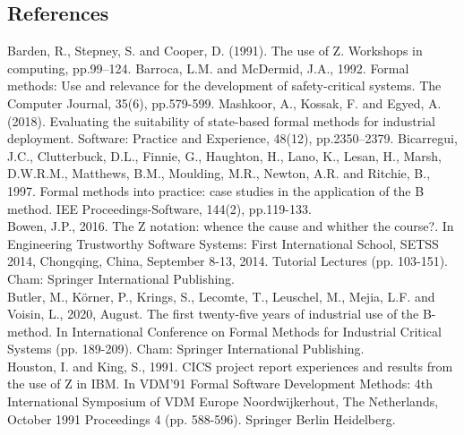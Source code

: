 \documentclass{article}
\begin{document}
\subsection*{References}

Barden, R., Stepney, S. and Cooper, D. (1991). The use of Z. Workshops in computing, pp.99–124.
\newline
Barroca, L.M. and McDermid, J.A., 1992. Formal methods: Use and relevance for the development of safety-critical systems. The Computer Journal, 35(6), pp.579-599.
\newline
Mashkoor, A., Kossak, F. and Egyed, A. (2018). Evaluating the suitability of state-based formal methods for industrial deployment. Software: Practice and Experience, 48(12), pp.2350–2379.
\newline
Bicarregui, J.C., Clutterbuck, D.L., Finnie, G., Haughton, H., Lano, K., Lesan, H., Marsh, D.W.R.M., Matthews, B.M., Moulding, M.R., Newton, A.R. and Ritchie, B., 1997. Formal methods into practice: case studies in the application of the B method. IEE Proceedings-Software, 144(2), pp.119-133. \\
\newline
Bowen, J.P., 2016. The Z notation: whence the cause and whither the course?. In Engineering Trustworthy Software Systems: First International School, SETSS 2014, Chongqing, China, September 8-13, 2014. Tutorial Lectures (pp. 103-151). Cham: Springer International Publishing. \\
\newline
Butler, M., Körner, P., Krings, S., Lecomte, T., Leuschel, M., Mejia, L.F. and Voisin, L., 2020, August. The first twenty-five years of industrial use of the B-method. In International Conference on Formal Methods for Industrial Critical Systems (pp. 189-209). Cham: Springer International Publishing. \\
\newline
Houston, I. and King, S., 1991. CICS project report experiences and results from the use of Z in IBM. In VDM'91 Formal Software Development Methods: 4th International Symposium of VDM Europe Noordwijkerhout, The Netherlands, October 1991 Proceedings 4 (pp. 588-596). Springer Berlin Heidelberg. \\
\end{document}
